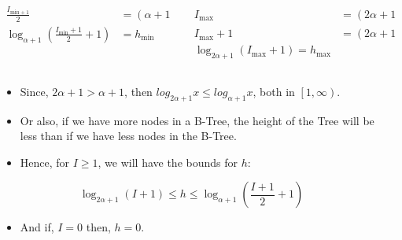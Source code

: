 \documentclass{beamer}
\begin{document}
\begin{frame}
\begin{columns}
\begin{column}{0.5\textwidth}
\begin{block}{}
\[\begin{aligned}
                        \frac{I_{\text{min} + 1}}{2} &= \left(\alpha + 1\right)^{h - 1} \\
                        \log_{\alpha + 1}\left(\frac{I_{\text{min}} + 1}{2} + 1\right) &= h_{\text{min}}
                    \end{aligned}
                \]
            \end{block}
        \end{column}
        \begin{column}{0.5\textwidth}
            \[
                \begin{aligned}
                    I_{\text{max}} &= \left(2\alpha + 1\right)^h - 1 \\
                    I_{\text{max}} + 1 &= \left(2\alpha + 1\right)^h \\
                    \log_{2\alpha + 1} \left(I_{\text{max}} + 1\right) = h_{\text{max}}
                \end{aligned}
            \]
        \end{column}
    \end{columns}

    \framebreak

    \begin{columns}
        \begin{column}{\textlecolumn}
            \begin{block}{}
                \begin{itemize}
                    \item Since, \(2\alpha + 1 > \alpha + 1\), then \(log_{2\alpha + 1} x \leq log_{\alpha + 1}x\), both in \(\left[1, \infty\right)\).
                    \item Or also, if we have more nodes in a B-Tree, the height of the Tree will be less than if we have less nodes in the B-Tree.
                    \item Hence, for \(I \geq 1\), we will have the bounds for \(h\):
                \end{itemize}
                \[
                    \log_{2\alpha + 1}\left(I + 1\right)
                    \leq
                    h
                    \leq
                    \log_{\alpha + 1}\left(\frac{I + 1}{2} + 1\right)
                \]
                \begin{itemize}
                    \item And if, \(I = 0\) then, \(h = 0\).
                \end{itemize}
            \end{block}
        \end{column}
        \begin{column}{\textricolumn}
        \end{column}
    \end{columns}
\end{frame}
\end{document}

